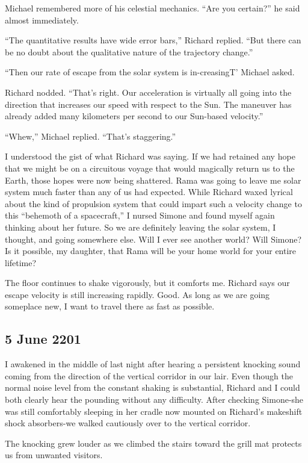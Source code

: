 \documentclass[]{article}
\begin{document}
Michael remembered more of his celestial mechanics. “Are you certain?” he said almost immediately.

“The quantitative results have wide error bars,” Richard replied. “But there can be no doubt about the qualitative nature of the trajectory change.”

“Then our rate of escape from the solar system is in-creasingT’ Michael asked.

Richard nodded. “That’s right. Our acceleration is virtually all going into the direction that increases our speed with respect to the Sun. The maneuver has already added many kilometers per second to our Sun-based velocity.”

“Whew,” Michael replied. “That’s staggering.”

I understood the gist of what Richard was saying. If we had retained any hope that we might be on a circuitous voyage that would magically return us to the Earth, those hopes were now being shattered. Rama was going to leave me solar system much faster than any of us had expected. While Richard waxed lyrical about the kind of propulsion system that could impart such a velocity change to this “behemoth of a spacecraft,” I nursed Simone and found myself again thinking about her future. So we are definitely leaving the solar system, I thought, and going somewhere else. Will I ever see another world? Will Simone? Is it possible, my daughter, that Rama will be your home world for your entire lifetime?

The floor continues to shake vigorously, but it comforts me. Richard says our escape velocity is still increasing rapidly. Good. As long as we are going someplace new, I want to travel there as fast as possible.

\subsection{5 June 2201}

I awakened in the middle of last night after hearing a persistent knocking sound coming from the direction of the vertical corridor in our lair. Even though the normal noise level from the constant shaking is substantial, Richard and I could both clearly hear the pounding without any difficulty. After checking Simone-she was still comfortably sleeping in her cradle now mounted on Richard’s makeshift shock absorbers-we walked cautiously over to the vertical corridor.

The knocking grew louder as we climbed the stairs toward the grill mat protects us from unwanted visitors.
\end{document}
